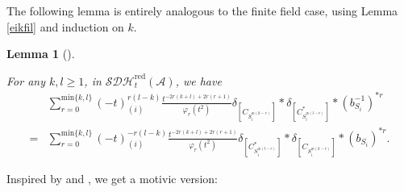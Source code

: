 \documentclass[12pt]{amsart}
\newtheorem{lemma}[theorem]{Lemma}
\theoremstyle{definition}
\numberwithin{equation}{section}
\begin{document}
The following lemma is entirely analogous to the finite field case, using Lemma \ref{eikfil} and induction on $ k $.

\begin{lemma}[{\itshape\cite[Lemma 3.3]{L23}}]\;
     \label{Commutation relation}
     
     For any $ k,l \geqslant 1 $, in $ \mathcal{SDH}_t^{\mathrm{red}}(\mathcal{A}) $, we have
     \begin{align*}
         &\sum_{r=0}^{\mathrm{min}\{k,l\}} (-t)_{(i)}^{r(l-k)} \frac{t^{-2r(k+l)+2r(r+1)}}{\varphi_r(t^2)} \delta_{[C_{S_i^{\oplus (k-r)}}]} * \delta_{[C_{S_i^{\oplus (l-r)}}^*]} * (b_{S_i}^{-1})^{*r} \\
         =&\sum_{r=0}^{\mathrm{min}\{k,l\}} (-t)_{(i)}^{{-r(l-k)}} \frac{t^{-2r(k+l)+2r(r+1)}}{\varphi_r(t^2)} \delta_{[C_{S_i^{\oplus (l-r)}}^*]} * \delta_{[C_{S_i^{\oplus (k-r)}}]} * (b_{S_i})^{*r}. 
     \end{align*}
     
    
\end{lemma}


Inspired by \cite[Theorem 3.4]{L23} and \cite[Theorem 3.2]{LLR23}, we get a motivic version:
\end{document}
